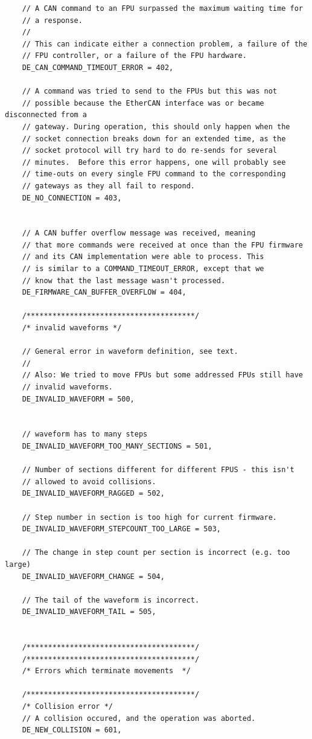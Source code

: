 \documentclass[11pt,a4paper]{scrartcl}
\begin{document}
\begin{verbatim}
    // A CAN command to an FPU surpassed the maximum waiting time for
    // a response.
    //
    // This can indicate either a connection problem, a failure of the
    // FPU controller, or a failure of the FPU hardware.
    DE_CAN_COMMAND_TIMEOUT_ERROR = 402,

    // A command was tried to send to the FPUs but this was not
    // possible because the EtherCAN interface was or became disconnected from a
    // gateway. During operation, this should only happen when the
    // socket connection breaks down for an extended time, as the
    // socket protocol will try hard to do re-sends for several
    // minutes.  Before this error happens, one will probably see
    // time-outs on every single FPU command to the corresponding
    // gateways as they all fail to respond.
    DE_NO_CONNECTION = 403,


    // A CAN buffer overflow message was received, meaning 
    // that more commands were received at once than the FPU firmware 
    // and its CAN implementation were able to process. This
    // is similar to a COMMAND_TIMEOUT_ERROR, except that we
    // know that the last message wasn't processed.
    DE_FIRMWARE_CAN_BUFFER_OVERFLOW = 404,

    /***************************************/
    /* invalid waveforms */

    // General error in waveform definition, see text.
    //
    // Also: We tried to move FPUs but some addressed FPUs still have
    // invalid waveforms.
    DE_INVALID_WAVEFORM = 500,


    // waveform has to many steps
    DE_INVALID_WAVEFORM_TOO_MANY_SECTIONS = 501,

    // Number of sections different for different FPUS - this isn't
    // allowed to avoid collisions.
    DE_INVALID_WAVEFORM_RAGGED = 502,

    // Step number in section is too high for current firmware.
    DE_INVALID_WAVEFORM_STEPCOUNT_TOO_LARGE = 503,

    // The change in step count per section is incorrect (e.g. too large)
    DE_INVALID_WAVEFORM_CHANGE = 504,

    // The tail of the waveform is incorrect.
    DE_INVALID_WAVEFORM_TAIL = 505,


    /***************************************/
    /***************************************/
    /* Errors which terminate movements  */

    /***************************************/
    /* Collision error */
    // A collision occured, and the operation was aborted.
    DE_NEW_COLLISION = 601,


\end{verbatim}
\end{document}
